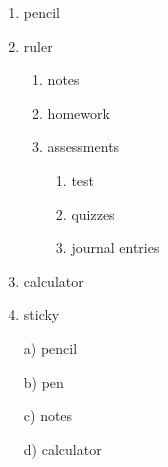 \documentclass[12pt]{article}
\begin{document}
\begin{enumerate}
    \item pencil
    \item ruler
        \begin{enumerate}
            \item notes
            \item homework
            \item assessments
            \begin{enumerate}
                \item test
                \item quizzes
                \item journal entries
            \end{enumerate}
        \end{enumerate}
    \item calculator
    \item sticky
    
\end{enumerate}

\begin{enumerate}
    \item[a)] pencil
    \item[b)] pen
    \item[c)] notes
    \item[d)] calculator
    
\end{enumerate}
\end{document}
